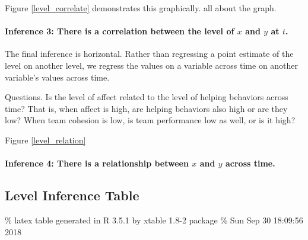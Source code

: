 \documentclass[]{article}
\let\oldparagraph\paragraph
\renewcommand{\paragraph}[1]{\oldparagraph{#1}\mbox{}}
\begin{document}
Figure \ref{level_correlate} demonstrates this graphically. all about
the graph.

\hypertarget{inference-3-there-is-a-correlation-between-the-level-of-x-and-y-at-t.}{%
\paragraph{\texorpdfstring{Inference 3: There is a correlation between
the level of \(x\) and \(y\) at
\(t\).}{Inference 3: There is a correlation between the level of x and y at t.}}\label{inference-3-there-is-a-correlation-between-the-level-of-x-and-y-at-t.}}

The final inference is horizontal. Rather than regressing a point
estimate of the level on another level, we regress the values on a
variable across time on another variable's values across time.

Questions. Is the level of affect related to the level of helping
behaviors across time? That is, when affect is high, are helping
behaviors also high or are they low? When team cohesion is low, is team
performance low as well, or is it high?

Figure \ref{level_relation}

\hypertarget{inference-4-there-is-a-relationship-between-x-and-y-across-time.}{%
\paragraph{\texorpdfstring{Inference 4: There is a relationship between
\(x\) and \(y\) across
time.}{Inference 4: There is a relationship between x and y across time.}}\label{inference-4-there-is-a-relationship-between-x-and-y-across-time.}}

\hypertarget{level-inference-table}{%
\subsection{Level Inference Table}\label{level-inference-table}}

\% latex table generated in R 3.5.1 by xtable 1.8-2 package \% Sun Sep
30 18:09:56 2018
\end{document}
